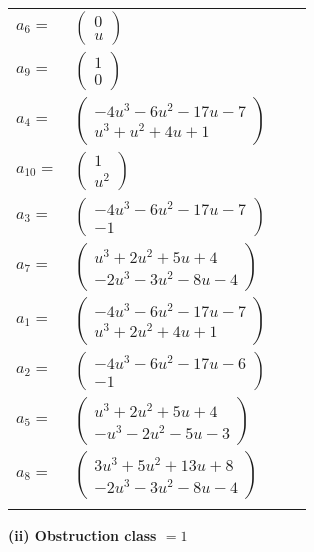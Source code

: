 \documentclass[1p]{elsarticle_modified}
\theoremstyle{definition}
\begin{document}
\begin{tabular}{m{7pt} m{180pt} m{7pt} m{180pt} }
\flushright $a_{6}=$&$\begin{pmatrix}0\\u\end{pmatrix}$ \\
\flushright $a_{9}=$&$\begin{pmatrix}1\\0\end{pmatrix}$ \\
\flushright $a_{4}=$&$\begin{pmatrix}-4 u^3-6 u^2-17 u-7\\u^3+u^2+4 u+1\end{pmatrix}$ \\
\flushright $a_{10}=$&$\begin{pmatrix}1\\u^2\end{pmatrix}$ \\
\flushright $a_{3}=$&$\begin{pmatrix}-4 u^3-6 u^2-17 u-7\\-1\end{pmatrix}$ \\
\flushright $a_{7}=$&$\begin{pmatrix}u^3+2 u^2+5 u+4\\-2 u^3-3 u^2-8 u-4\end{pmatrix}$ \\
\flushright $a_{1}=$&$\begin{pmatrix}-4 u^3-6 u^2-17 u-7\\u^3+2 u^2+4 u+1\end{pmatrix}$ \\
\flushright $a_{2}=$&$\begin{pmatrix}-4 u^3-6 u^2-17 u-6\\-1\end{pmatrix}$ \\
\flushright $a_{5}=$&$\begin{pmatrix}u^3+2 u^2+5 u+4\\- u^3-2 u^2-5 u-3\end{pmatrix}$ \\
\flushright $a_{8}=$&$\begin{pmatrix}3 u^3+5 u^2+13 u+8\\-2 u^3-3 u^2-8 u-4\end{pmatrix}$\\&\end{tabular}
\flushleft \textbf{(ii) Obstruction class $= 1$}\\~\\
\end{document}
